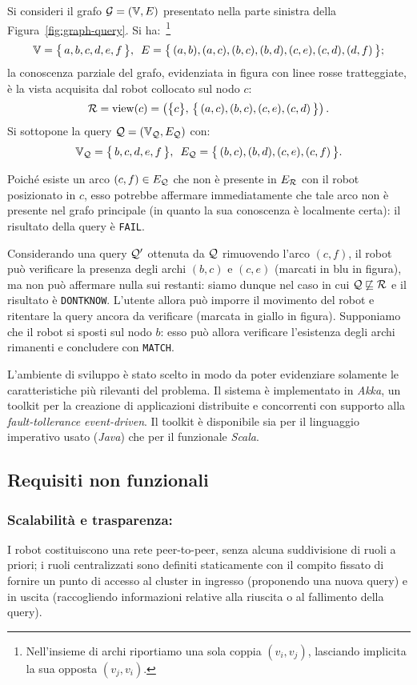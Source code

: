 \begin{example}
Si consideri il grafo $\mathcal{G} = (\mathbb{V}, E)$ presentato nella parte sinistra
della Figura~\ref{fig:graph-query}. Si ha:~\footnote{Nell'insieme di archi
riportiamo una sola coppia $(v_i, v_j)$, lasciando implicita la sua
opposta $(v_j, v_i)$.}
\[
\mathbb{V} = \bigl\{\,a, b, c, d, e, f\,\bigr\}, \ \,
E = \bigl\{\,(a,b),(a,c),(b,c),(b,d),(c,e),(c,d),(d,f)\,\bigr\};
\]
la conoscenza parziale del grafo,
evidenziata in figura con linee rosse tratteggiate,
è la vista acquisita dal robot collocato
sul nodo $c$: \[
\mathcal{R} = \mathrm{view}(c) = \left(\bigl\{c\bigr\},\,
\bigl\{\,(a,c), (b,c), (c,e), (c,d)\,\bigr\}\right). \]
Si sottopone la query $\mathcal{Q} = (\mathbb{V}_{\mathcal{Q}}, E_{\mathcal{Q}})$ con:\[
\mathbb{V}_{\mathcal{Q}} = \bigl\{\,b, c, d, e, f\,\bigr\}, \ \,
E_{\mathcal{Q}} = \bigl\{\,(b,c),(b,d),(c,e),(c,f)\,\bigr\}. \]

Poiché esiste un arco $(c,f) \in E_{\mathcal{Q}}$ che non è presente in $E_{\mathcal{R}}$
con il robot posizionato in $c$, esso potrebbe affermare immediatamente
che tale arco non è presente nel grafo principale
(in quanto la sua conoscenza è localmente certa): il risultato della query
è \texttt{FAIL}.

Considerando una query $\mathcal{Q}'$ ottenuta da $\mathcal{Q}$ rimuovendo l'arco
$(c, f)$, il robot può verificare la presenza degli archi $(b,c)$ e $(c,e)$
(marcati in blu in figura), ma non può affermare nulla sui restanti:
siamo dunque nel caso in cui $\mathcal{Q} \not\sqsubseteq \mathcal{R}$ e il risultato
è \texttt{DONTKNOW}.
L'utente allora può imporre il movimento del robot e ritentare
la query ancora da verificare (marcata in giallo in figura).
Supponiamo che il robot si sposti sul nodo $b$: esso può allora verificare
l'esistenza degli archi rimanenti e concludere con \texttt{MATCH}.
\end{example}

L'ambiente di sviluppo è stato scelto in modo da poter
evidenziare solamente le caratteristiche più rilevanti del problema.
Il sistema è implementato in \emph{Akka}, un toolkit per
la creazione di applicazioni distribuite e concorrenti con supporto
alla \emph{fault-tollerance event-driven}.
Il toolkit è disponibile sia per il linguaggio imperativo usato (\emph{Java})
che per il funzionale \emph{Scala}.

\subsection{Requisiti non funzionali}
\label{sec:nonfunc-req}

\subsubsection*{Scalabilità e trasparenza:}
I robot costituiscono una rete peer-to-peer,
senza alcuna suddivisione di ruoli a priori; i ruoli centralizzati
sono definiti staticamente con il compito fissato di fornire un punto
di accesso al cluster in ingresso (proponendo una nuova query) e
in uscita (raccogliendo informazioni relative alla riuscita
o al fallimento della query).


